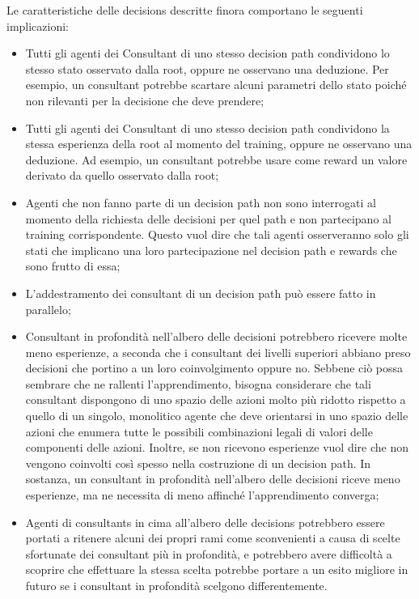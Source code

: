 \documentclass[conference]{IEEEtran}
\begin{document}
Le caratteristiche delle decisions descritte finora comportano
le seguenti implicazioni:
\begin{itemize}
    \item Tutti gli agenti dei Consultant di uno stesso decision path condividono
    lo stesso stato osservato dalla root, oppure ne osservano una deduzione.
    Per esempio, un consultant potrebbe scartare alcuni parametri dello stato
    poiché non rilevanti per la decisione che deve prendere;
    \item Tutti gli agenti dei Consultant di uno stesso decision path condividono
    la stessa esperienza della root al momento del training, oppure ne osservano
    una deduzione. Ad esempio, un consultant potrebbe
    usare come reward un valore derivato da quello osservato dalla root;
    \item Agenti che non fanno parte di un decision path non sono interrogati al momento
    della richiesta delle decisioni per quel path e non partecipano al training corrispondente.
    Questo vuol dire che tali agenti osserveranno solo gli stati che implicano una loro
    partecipazione nel decision path e rewards che sono frutto di essa;
    \item L'addestramento dei consultant di un decision path può essere fatto in parallelo;
    \item Consultant in profondità nell'albero delle decisioni potrebbero ricevere molte meno
    esperienze, a seconda che i consultant dei livelli superiori abbiano preso decisioni
    che portino a un loro coinvolgimento oppure no. Sebbene ciò possa sembrare che ne rallenti
    l'apprendimento, bisogna considerare che tali consultant dispongono di uno spazio delle azioni
    molto più ridotto rispetto a quello di un singolo, monolitico agente che deve orientarsi
    in uno spazio delle azioni che enumera tutte le possibili combinazioni legali di valori
    delle componenti delle azioni. Inoltre, se non ricevono esperienze vuol dire che
    non vengono coinvolti così spesso nella costruzione di un decision path. In sostanza,
    un consultant in profondità nell'albero delle decisioni riceve meno esperienze, ma
    ne necessita di meno affinché l'apprendimento converga;
    \item Agenti di consultants in cima all'albero delle decisions potrebbero essere
    portati a ritenere alcuni dei propri rami come sconvenienti a causa di scelte
    sfortunate dei consultant più in profondità, e potrebbero avere difficoltà
     a scoprire che
    effettuare la stessa scelta potrebbe portare a un esito migliore in futuro se
    i consultant in profondità scelgono differentemente.
\end{itemize}
\end{document}
